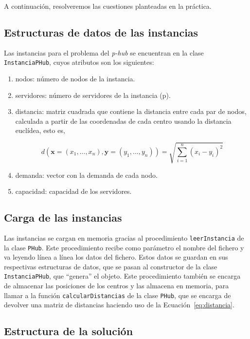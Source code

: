 \documentclass[11pt,a4paper,twoside,openright,titlepage,final]{article}
\begin{document}
A continuación, resolveremos las cuestiones planteadas en la práctica.

\subsection{Estructuras de datos de las instancias}

Las instancias para el problema del \textit{p-hub} se encuentran en la clase \texttt{InstanciaPHub}, cuyos atributos son los siguientes:

\begin{enumerate}
	\item nodos: número de nodos de la instancia.
	\item servidores: número de servidores de la instancia (p).
	\item distancia: matriz cuadrada que contiene la distancia entre cada par de nodos, calculada a partir de las coordenadas de cada centro usando la distancia euclídea, esto es,
	
	\begin{equation}
	\label{eq:distancia}
	d(\mathbf{x} =(x_1,\dots, x_n), \mathbf{y} = (y_1,\dots, y_n)) = \sqrt{\sum_{i=1}^{n} (x_i - y_i)^2 }
	\end{equation}
	
	\item demanda: vector con la demanda de cada nodo.
	\item capacidad: capacidad de los servidores.
\end{enumerate}

\subsection{Carga de las instancias}

Las instancias se cargan en memoria gracias al procedimiento \texttt{leerInstancia} de la clase \texttt{PHub}. Este procedimiento recibe como parámetro el nombre del fichero y va leyendo línea a línea los datos del fichero. Estos datos se guardan en sus respectivas estructuras de datos, que se pasan al constructor de la clase \texttt{InstanciaPHub}, que ``genera'' el objeto. Este procedimiento también se encarga de almacenar las posiciones de los centros y las almacena en memoria, para llamar a la función \texttt{calcularDistancias} de la clase \texttt{PHub}, que se encarga de devolver una matriz de distancias haciendo uso de la Ecuación~\ref{eq:distancia}.

\subsection{Estructura de la solución}
\end{document}
